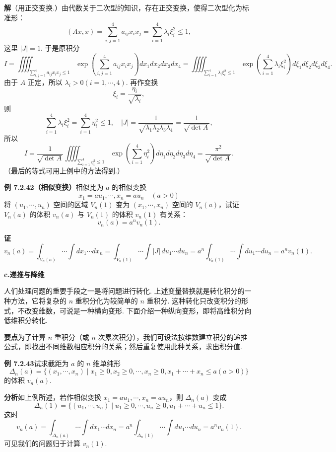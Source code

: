 \documentclass[UTF8, 12pt, fontset=fandol, oneside]{ctexart}
\begin{document}
\noindent\textbf{解}\quad （用正交变换.）由代数关于二次型的知识，存在正交变换，使得二次型化为标准形：
\[
(Ax,x)=\sum_{i,j=1}^4a_{ij}x_ix_j=\sum_{i=1}^4\lambda_i\xi_i^2\le1,
\]
这里 $|J|=1$. 于是原积分
\[
I=\iiiint_{\sum_{i,j=1}^4a_{ij}x_ix_j\le1}
\exp\left(\sum_{i,j=1}^4a_{ij}x_ix_j\right)dx_1dx_2dx_3dx_4
=\iiiint_{\sum_{i=1}^4\lambda_i\xi_i^2\le1}
\exp\left(\sum_{i=1}^4\lambda_i\xi_i^2\right)d\xi_1d\xi_2d\xi_3d\xi_4.
\]
由于 $A$ 正定，所以 $\lambda_i>0(i=1,\cdots,4)$. 再作变换
\[
\xi_i=\frac{\eta_i}{\sqrt{\lambda_i}},
\]
则
\[
\sum_{i=1}^4\lambda_i\xi_i^2=\sum_{i=1}^4\eta_i^2\le1,\quad
|J|=\frac1{\sqrt{\lambda_1\lambda_2\lambda_3\lambda_4}}
=\frac1{\sqrt{\det A}},
\]
所以
\[
I=\frac1{\sqrt{\det A}}\iiiint_{\sum_{i=1}^4\eta_i^2\le1}
\exp\left(\sum_{i=1}^4\eta_i^2\right)d\eta_1d\eta_2d\eta_3d\eta_4
=\frac{\pi^2}{\sqrt{\det A}}.
\]
（最后的等式可用上例中的方法得到.）

\noindent\textbf{例 7.2.42（相似变换）}\quad 相似比为 $a$ 的相似变换
\[
x_1=au_1,\cdots,x_n=au_n\quad(a>0)
\]
将 $(u_1,\cdots,u_n)$ 空间的区域 $V_n(1)$ 变为 $(x_1,\cdots,x_n)$ 空间的 $V_n(a)$，试证 $V_n(a)$ 的体积 $v_n(a)$ 与 $V_n(1)$ 的体积 $v_n(1)$ 有关系：
\[
v_n(a)=a^nv_n(1).
\]

\noindent\textbf{证}\quad
\[
v_n(a)=\int_{V_n(a)}\cdots\int dx_1\cdots dx_n
=\int_{V_n(1)}\cdots\int |J|\,du_1\cdots du_n
=a^n\int_{V_n(1)}\cdots\int du_1\cdots du_n
=a^nv_n(1).
\]

\noindent\textbf{c.\quad 递推与降维}

人们处理问题的重要手段之一是将问题进行转化. 上述变量替换就是转化积分的一种方法，它将复杂的 $n$ 重积分化为较简单的 $n$ 重积分. 这种转化只改变积分的形式，不改变维数，可说是一种横向变形. 下面介绍一种纵向变形，即将高维积分向低维积分转化.

\noindent\textbf{要点}\quad 为了计算 $n$ 重积分（或 $n$ 次累次积分），我们可设法按维数建立积分的递推公式，即找出不同维数相应积分的关系；然后重复使用此种关系，求出积分值.

\noindent\textbf{例 7.2.43}\quad 试求截距为 $a$ 的 $n$ 维单纯形
\[
\Delta_n(a)=\{(x_1,\cdots,x_n)\mid x_1\ge0,x_2\ge0,\cdots,x_n\ge0,
x_1+\cdots+x_n\le a(a>0)\} \tag{1}
\]
的体积 $v_n(a)$.

\noindent\textbf{分析}\quad 如上例所述，若作相似变换 $x_1=au_1,\cdots,x_n=au_n$，则 $\Delta_n(a)$ 变成
\[
\Delta_n(1)=\{(u_1,\cdots,u_n)\mid u_1\ge0,\cdots,u_n\ge0,u_1+\cdots+u_n\le1\}. \tag{2}
\]
这时
\[
v_n(a)=\int_{\Delta_n(a)}\cdots\int dx_1\cdots dx_n
=a^n\int_{\Delta_n(1)}\cdots\int du_1\cdots du_n
=a^nv_n(1). \tag{3}
\]
可见我们的问题归于计算 $v_n(1)$.
\end{document}
